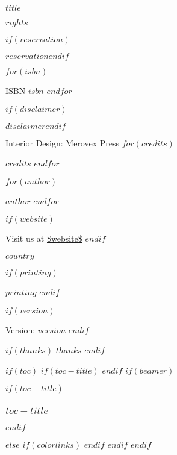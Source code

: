 \documentclass[$if(fontsize)$$fontsize$,$endif$$if(lang)$$babel-lang$,$endif$$if(papersize)$$papersize$paper,$endif$$if(beamer)$ignorenonframetext,$if(handout)$handout,$endif$$if(aspectratio)$aspectratio=$aspectratio$,$endif$$endif$$for(classoption)$$classoption$$sep$,$endfor$]{$documentclass$}
\begin{document}
  \vspace*{\fill}

  \par\noindent\emph{$title$}\newline
  \par\noindent\emph{$rights$}\newline

  \footnotesize
  $if(reservation)$\par\noindent $reservation$\newline$endif$

  $for(isbn)$
    \par\noindent ISBN $isbn$
  $endfor$\newline

  \footnotesize
  $if(disclaimer)$\par\noindent $disclaimer$\newline$endif$

  \par\noindent Interior Design: Merovex Press %
  $for(credits)$
    \par\noindent $credits$
  $endfor$\newline

  \par\noindent $for(author)$
      \par\noindent $author$
    $endfor$\newline

  $if(website)$
    \par\noindent Visit us at \url{$website$}\newline
  $endif$

  \par\noindent $country$
  \newline

  $if(printing)$
    \par\noindent\textit{$printing$}
    \newline
  $endif$

  $if(version)$
  \par\noindent Version: $version$
  $endif$
  \vspace*{\fill}
  \clearpage\normalsize

  $if(thanks)$
    $thanks$
    \newpage
  $endif$

  $if(toc)$
    $if(toc-title)$
      \renewcommand*\contentsname{$toc-title$}
    $endif$
    $if(beamer)$
      \begin{frame}
        $if(toc-title)$
        \frametitle{$toc-title$}
        $endif$
        \tableofcontents[hideallsubsections]
      \end{frame}
    $else$
    {
      $if(colorlinks)$
        \hypersetup{linkcolor=$if(toccolor)$$toccolor$$else$$endif$}
      $endif$
      \setcounter{tocdepth}{$toc-depth$}
      \tableofcontents
    }
    $endif$
  $endif$
\end{document}
